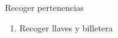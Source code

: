 \item Recoger pertenencias
  \begin{enumerate}
  \def\labelenumi{\arabic{enumi}.}
  \tightlist
  \item Recoger llaves y billetera
  \end{enumerate}